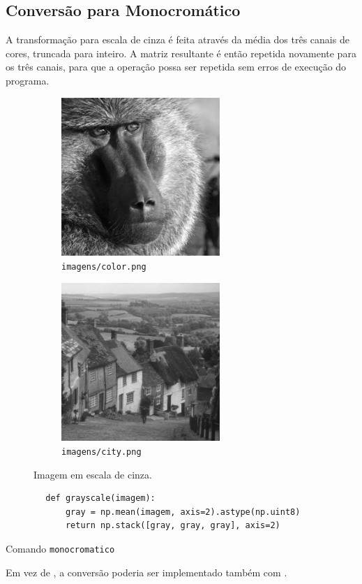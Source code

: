 \subsection{Conversão para Monocromático}

A transformação para escala de cinza é feita através da média dos três canais de cores, truncada para inteiro. A matriz resultante é então repetida novamente para os três canais, para que a operação possa ser repetida sem erros de execução do programa.

\begin{figure}[H]
    \centering
    \begin{subfigure}{0.45\textwidth}
        \centering
        \includegraphics[width=6cm]{resultados/colormono.png}
        \caption{\texttt{imagens/color.png}}
    \end{subfigure}%
    \begin{subfigure}{0.45\textwidth}
        \centering
        \includegraphics[width=6cm]{resultados/citymono.png}
        \caption{\texttt{imagens/city.png}}
        \label{fig:res:1}
    \end{subfigure}

    \caption{Imagem em escala de cinza.}
\end{figure}

\begin{listing}[H]
    \begin{verbatim}
        def grayscale(imagem):
            gray = np.mean(imagem, axis=2).astype(np.uint8)
            return np.stack([gray, gray, gray], axis=2)
    \end{verbatim}

    \caption{Comando \texttt{monocromatico}}
\end{listing}

Em vez de , a conversão poderia ser implementado também com  \autocite{ref:cvtcolor}.
